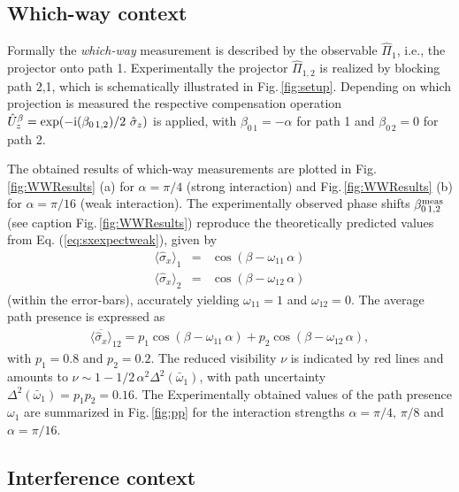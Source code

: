 \documentclass[english,keywords,aps,twocolumn]{revtex4-1}
\begin{document}
\subsection{Which-way context}
Formally the \emph{which-way} measurement is described by the observable $\hat\Pi_1$, i.e., the projector onto path 1. Experimentally the projector $\hat\Pi_{1,2}$ is realized by blocking path 2,1, which is schematically illustrated in Fig.\,\ref{fig:setup}. 
Depending on which projection is measured the respective compensation operation $\hat U^\beta_z=\textrm{exp}(-{\rm i}(\beta_{0\,1,2})/2\,\,\hat\sigma_z)$ is applied, with $\beta_{0\, 1}=-\alpha$ for path 1 and $\beta_{0\, 2}=0$ for path 2.
%



%
The obtained results of which-way measurements are plotted in Fig.\,\ref{fig:WWResults} (a) for $\alpha=\pi/4$ (strong interaction) and Fig.\,\ref{fig:WWResults} (b) for $\alpha=\pi/16$ (weak interaction). The experimentally observed phase shifts $\beta^{\rm{meas}}_{0\,1,2}$ (see caption Fig.\,\ref{fig:WWResults}) reproduce the theoretically predicted values from Eq. (\ref{eq:sxexpectweak}), given by 
\begin{eqnarray}
\langle\hat\sigma_x\rangle_1&=&\cos(\beta-\omega_{11}\,\alpha)\nonumber\\
\langle\hat\sigma_x\rangle_2&=&\cos(\beta-\omega_{12}\,\alpha) 
\end{eqnarray}
 (within the error-bars), accurately yielding $\omega_{11}=1$ and $\omega_{12}=0$. 
The average path presence is expressed as
 \begin{eqnarray}
\overline{\langle\hat\sigma_x\rangle}_{12}=p_1\cos(\beta-\omega_{11}\,\alpha)+p_2\cos(\beta-\omega_{12}\,\alpha),
\end{eqnarray}
with $p_1=0.8$ and $p_2=0.2$. The reduced visibility $\nu$ is indicated by red lines and amounts to $\nu\sim 1 -1/2\,\alpha^2 \mathit\Delta^2(\bar \omega_{1})$, with path uncertainty $ \mathit\Delta^2(\bar \omega_{1}) 
=p_1p_2=0.16$. 
The Experimentally obtained values of the path presence $\omega_1$ are summarized in Fig.\,\ref{fig:pp} for the interaction strengths $\alpha=\pi/4,\,\pi/8$ and $\alpha=\pi/16$.
 


\subsection{Interference context}
\end{document}
